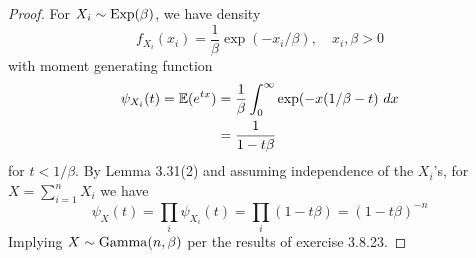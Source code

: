 \documentclass[a4paper]{article}
\begin{document}
\begin{proof}[Proof] 
For \(X_{i} \sim \operatorname{Exp}(\beta )\), we have density
\[
	f_{X_{i}}(x_{i}) = \frac{1}{\beta } \exp(-x_{i}/\beta ), \quad x_{i}, \beta >0
\]
with moment generating function
\begin{align*}
	\psi_{X_{i}}(t) = \mathbb{E}(e^{tx}) & = \frac{1}{\beta } \int^{\infty}_{0} \exp(-x(1/\beta -t) \ dx  \\
	 & = \frac{1}{1-t \beta } 
\end{align*}
for \( t < 1/\beta \). By Lemma 3.31(2) and assuming independence of the \(X_{i}\)'s, for \(X = \sum_{i=1}^{n} X_{i}\) we have
\[
	\psi_{X}(t) = \prod_{i} \psi_{X_{i}}(t) = \prod_{i} (1 - t \beta ) = (1-t \beta )^{-n}   
\]
Implying \(X \sim \operatorname{Gamma}(n, \beta )\) per the results of exercise 3.8.23.

\end{proof}
\end{document}
